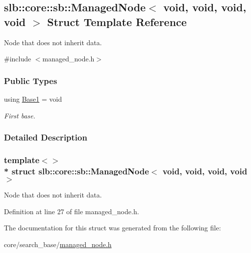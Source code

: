 \hypertarget{structslb_1_1core_1_1sb_1_1ManagedNode_3_01void_00_01void_00_01void_00_01void_01_4}{}\subsection{slb\+:\+:core\+:\+:sb\+:\+:Managed\+Node$<$ void, void, void, void $>$ Struct Template Reference}
\label{structslb_1_1core_1_1sb_1_1ManagedNode_3_01void_00_01void_00_01void_00_01void_01_4}


Node that does not inherit data.  




{\ttfamily \#include $<$managed\+\_\+node.\+h$>$}

\subsubsection*{Public Types}
\begin{DoxyCompactItemize}
\item 
using \hyperlink{structslb_1_1core_1_1sb_1_1ManagedNode_3_01void_00_01void_00_01void_00_01void_01_4_a3fad1ffb1c7019ceae6d9a0a62ed0e04}{Base1} = void\hypertarget{structslb_1_1core_1_1sb_1_1ManagedNode_3_01void_00_01void_00_01void_00_01void_01_4_a3fad1ffb1c7019ceae6d9a0a62ed0e04}{}\label{structslb_1_1core_1_1sb_1_1ManagedNode_3_01void_00_01void_00_01void_00_01void_01_4_a3fad1ffb1c7019ceae6d9a0a62ed0e04}

\begin{DoxyCompactList}\small\item\em First base. \end{DoxyCompactList}\end{DoxyCompactItemize}


\subsubsection{Detailed Description}
\subsubsection*{template$<$$>$\\*
struct slb\+::core\+::sb\+::\+Managed\+Node$<$ void, void, void, void $>$}

Node that does not inherit data. 

Definition at line 27 of file managed\+\_\+node.\+h.



The documentation for this struct was generated from the following file\+:\begin{DoxyCompactItemize}
\item 
core/search\+\_\+base/\hyperlink{managed__node_8h}{managed\+\_\+node.\+h}\end{DoxyCompactItemize}
